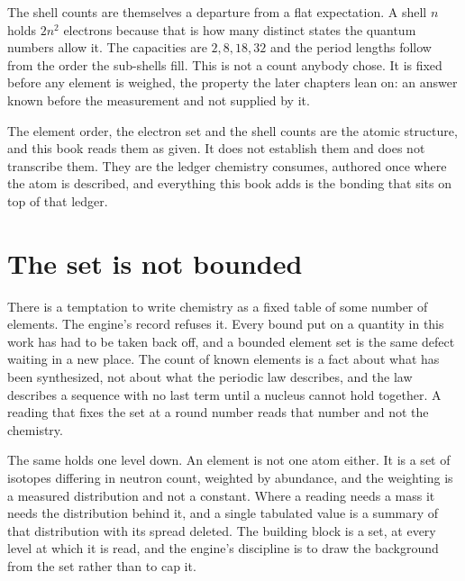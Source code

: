 The shell counts are themselves a departure from a flat expectation. A shell \(n\) holds \(2n^2\)
electrons because that is how many distinct states the quantum numbers allow it. The capacities
are \(2, 8, 18, 32\) and the period lengths follow from the order the sub-shells fill. This is not a
count anybody chose. It is fixed before any element is weighed, the property the later
chapters lean on: an answer known before the measurement and not supplied by it.

The element order, the electron set and the shell counts are the atomic structure, and this book
reads them as given. It does not establish them and does not transcribe them. They are the ledger
chemistry consumes, authored once where the atom is described, and everything this book adds is the
bonding that sits on top of that ledger.

\section{The set is not bounded}

There is a temptation to write chemistry as a fixed table of some number of elements. The engine's
record refuses it. Every bound put on a quantity in this work has had to be taken back off, and a
bounded element set is the same defect waiting in a new place. The count of known elements is a fact
about what has been synthesized, not about what the periodic law describes, and the law describes a
sequence with no last term until a nucleus cannot hold together. A reading that fixes the set at a
round number reads that number and not the chemistry.

The same holds one level down. An element is not one atom either. It is a set of isotopes differing
in neutron count, weighted by abundance, and the weighting is a measured distribution and not a
constant. Where a reading needs a mass it needs the distribution behind it, and a single tabulated
value is a summary of that distribution with its spread deleted. The building block is a set, at
every level at which it is read, and the engine's discipline is to draw the background from the set
rather than to cap it.
